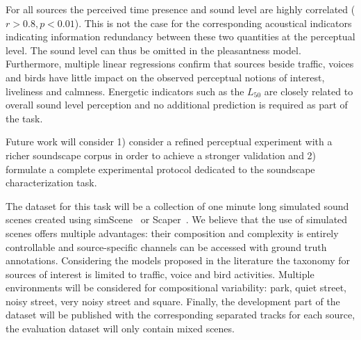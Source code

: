 \documentclass{article}
\begin{document}
\begin{sloppy}
For all sources the perceived time presence and sound level are highly correlated ($r>0.8, p<0.01$). This is not the case for the corresponding acoustical indicators indicating information redundancy between these two quantities at the perceptual level. The sound level can thus be omitted in the pleasantness model. Furthermore, multiple linear regressions confirm that sources beside traffic, voices and birds have little impact on the observed perceptual notions of interest, liveliness and calmness. Energetic indicators such as the $L_{50}$ are closely related to overall sound level perception and no additional prediction is required as part of the task.

Future work will consider 1) consider a refined perceptual experiment with a richer soundscape corpus in order to achieve a stronger validation and 2) formulate a complete  experimental protocol dedicated to the soundscape characterization task.

The dataset for this task will be a collection of one minute long simulated sound scenes created using simScene~\cite{rossignol2015} or Scaper~\cite{salamon2017}. We believe that the use of simulated scenes offers multiple advantages: their composition and complexity is entirely controllable and source-specific channels can be accessed with ground truth annotations. Considering the models proposed in the literature the taxonomy for sources of interest is limited to traffic, voice and bird activities. Multiple environments will be considered for compositional variability: park, quiet street, noisy street, very noisy street and square. Finally, the development part of the dataset will be published with the corresponding separated tracks for each source, the evaluation dataset will only contain mixed scenes.







\end{sloppy}
\end{document}
